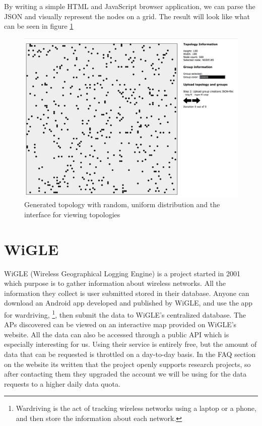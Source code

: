 By writing a simple HTML and JavaScript browser application, we can parse the JSON and visually represent the nodes on a grid.
The result will look like what can be seen in figure \ref{fig:randtop}

\begin{figure}[h]
\center
\includegraphics[scale=0.35]{Images/interface.png}
\caption{Generated topology with random, uniform distribution and the interface for viewing topologies}
\label{fig:randtop}
\end{figure}

\section{WiGLE}
WiGLE (Wireless Geographical Logging Engine) \cite{wigle} is a project started in 2001 which purpose is to gather information about wireless networks. All the information
they collect is user submitted stored in their database. Anyone can download an Android app developed and published by WiGLE, and use the app for wardriving,
\footnote{Wardriving is the act of tracking wireless networks using a laptop or a phone,	and then store the information about each network.},
	then submit the data to WiGLE's centralized database. The APs discovered can be viewed on an interactive map provided on WiGLE's website. 
	All the data can also be accessed through a public API which is especially interesting for us. Using their service is entirely free, but the
	amount of data that can be requested is throttled on a day-to-day basis. In the FAQ section on the website its written that the project openly supports research projects, 
	so after contacting them they upgraded the account we will be using for the data requests to a higher daily data quota.

